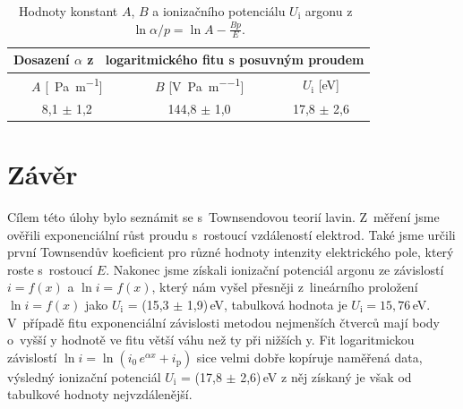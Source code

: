 \documentclass[a4paper,12pt]{article}
\begin{document}
\begin{center}
	\begin{table}[h]
		\centering
		\caption{Hodnoty konstant $A$, $B$ a ionizačního potenciálu $U_\text{i}$ 
			argonu z~$\ln \alpha/p = \ln A - \frac{Bp}{E}$.}
		\label{tabiposun2}
		\begin{tabular}{|c|c|c|} \hline
			\multicolumn{3}{|c|}{Dosazení $\alpha$ z~ logaritmického fitu s posuvným proudem} \\ \hline
			$A$ [\si{\per\pascal\per\meter}] & $B$ [\si{\volt\per\pascal\per\meter}] & $U_\text{i}$ [eV] \\ \hline
			8,1 $\pm$ 1,2 & 144,8 $\pm$ 1,0 &  17,8 $\pm$ 2,6 \\ \hline

		\end{tabular}
	\end{table}
\end{center}

\newpage
\section{Závěr}
Cílem této úlohy bylo seznámit se s~Townsendovou teorií lavin. Z~měření jsme 
ověřili exponenciální růst proudu s~rostoucí vzdáleností elektrod. Také jsme 
určili první Townsendův koeficient pro různé hodnoty intenzity elektrického 
pole, který roste s~rostoucí $E$. Nakonec jsme získali ionizační potenciál 
argonu ze závislostí $i = f(x)$ a $\ln i = f(x)$, který nám vyšel přesněji
z~lineárního proložení $\ln i = f(x)$ jako $U_\text{i}$ = (15,3 $\pm$  1,9)\,eV, 
tabulková hodnota je $U_\text{i} = 15,76$\,eV. V~případě fitu exponenciální závislosti metodou nejmenších čtverců mají body o~vyšší y hodnotě ve fitu větší váhu než ty při nižších y. Fit logaritmickou závislostí $\ln i =\ln (i_0\,e^{\alpha x} + i_\text{p})$ sice velmi dobře kopíruje naměřená data, výsledný ionizační potenciál $U_\text{i}$ = (17,8 $\pm$  2,6)\,eV z něj získaný je však od tabulkové hodnoty nejvzdálenější.
\end{document}
